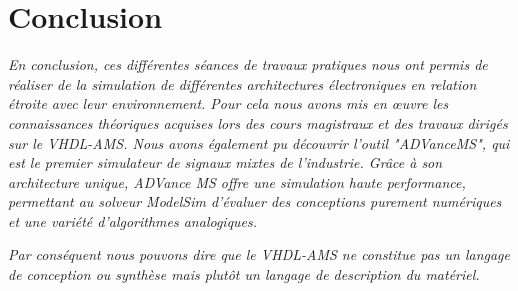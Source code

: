 \section{Conclusion}
\textit{En conclusion, ces différentes séances de travaux pratiques nous ont permis de réaliser de la simulation de différentes architectures électroniques en relation étroite avec leur environnement. Pour cela nous avons mis en œuvre les connaissances théoriques acquises lors des cours magistraux et des travaux dirigés sur le VHDL-AMS.
Nous avons également pu découvrir l'outil "ADVanceMS", qui est le premier simulateur de signaux mixtes de l'industrie. Grâce à son architecture unique, ADVance MS offre une simulation haute performance, permettant au solveur ModelSim d'évaluer des conceptions purement numériques et une variété d'algorithmes analogiques.}

\textit{Par conséquent nous pouvons dire que le VHDL-AMS ne constitue pas un langage de conception ou synthèse mais plutôt un langage de description du matériel.}